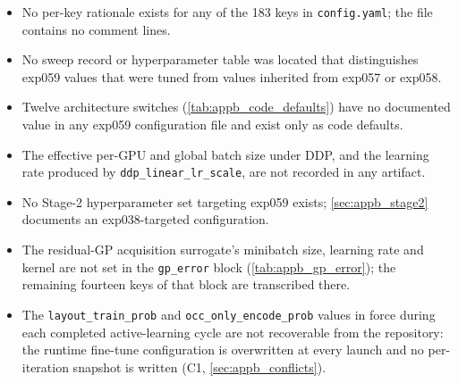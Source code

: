 \begin{itemize}
  \item No per-key rationale exists for any of the 183 keys in \texttt{config.yaml}; the
        file contains no comment lines.
  \item No sweep record or hyperparameter table was located that distinguishes exp059
        values that were tuned from values inherited from exp057 or exp058.
  \item Twelve architecture switches (\autoref{tab:appb_code_defaults}) have no documented
        value in any exp059 configuration file and exist only as code defaults.
  \item The effective per-GPU and global batch size under DDP, and the learning rate
        produced by \texttt{ddp\_linear\_lr\_scale}, are not recorded in any artifact.
  \item No Stage-2 hyperparameter set targeting exp059 exists;
        \autoref{sec:appb_stage2} documents an exp038-targeted configuration.
  \item The residual-GP acquisition surrogate's minibatch size, learning rate and kernel
        are not set in the \texttt{gp\_error} block (\autoref{tab:appb_gp_error}); the
        remaining fourteen keys of that block are transcribed there.
  \item The \texttt{layout\_train\_prob} and \texttt{occ\_only\_encode\_prob} values in
        force during each completed active-learning cycle are not recoverable from the
        repository: the runtime fine-tune configuration is overwritten at every launch and
        no per-iteration snapshot is written (C1, \autoref{sec:appb_conflicts}).
\end{itemize}

